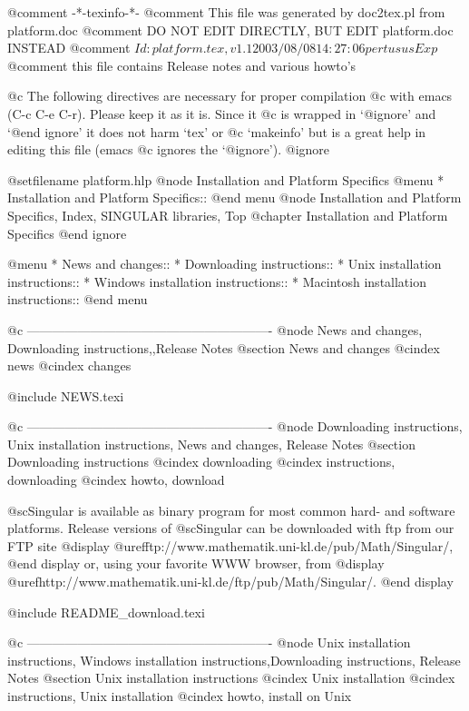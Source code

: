 @comment -*-texinfo-*-
@comment This file was generated by doc2tex.pl from platform.doc
@comment DO NOT EDIT DIRECTLY, BUT EDIT platform.doc INSTEAD
@comment $Id: platform.tex,v 1.1 2003/08/08 14:27:06 pertusus Exp $
@comment this file contains Release notes and various howto's

@c The following directives are necessary for proper compilation
@c with emacs (C-c C-e C-r).  Please keep it as it is.  Since it
@c is wrapped in `@ignore' and `@end ignore' it does not harm `tex' or
@c `makeinfo' but is a great help in editing this file (emacs
@c ignores the `@ignore').
@ignore

@setfilename platform.hlp
@node Installation and Platform Specifics
@menu
* Installation and Platform Specifics::
@end menu
@node Installation and Platform Specifics, Index, SINGULAR libraries, Top
@chapter Installation and Platform Specifics
@end ignore

@menu
* News and changes::
* Downloading instructions::
* Unix installation instructions::
* Windows installation instructions::
* Macintosh installation instructions::
@end menu

@c ----------------------------------------------------------
@node News and changes, Downloading instructions,,Release Notes
@section News and changes
@cindex news
@cindex changes

@include NEWS.texi

@c ----------------------------------------------------------
@node Downloading instructions, Unix installation instructions, News and changes, Release Notes
@section Downloading instructions
@cindex downloading
@cindex instructions, downloading
@cindex howto, download

@sc{Singular} is available as binary program for most common hard-
and software platforms. Release versions of @sc{Singular} can be
downloaded with ftp from our FTP site
@display
@uref{ftp://www.mathematik.uni-kl.de/pub/Math/Singular/},
@end display
or, using your favorite WWW browser, from
@display
@uref{http://www.mathematik.uni-kl.de/ftp/pub/Math/Singular/}.
@end display

@include README_download.texi

@c ----------------------------------------------------------
@node Unix installation instructions, Windows installation instructions,Downloading instructions, Release Notes
@section Unix installation instructions
@cindex Unix installation
@cindex instructions, Unix installation
@cindex howto, install on Unix

